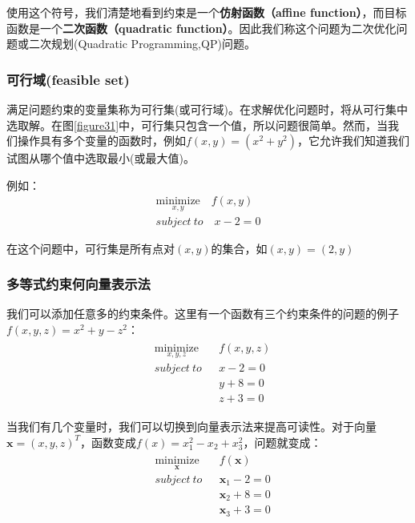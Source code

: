 使用这个符号，我们清楚地看到约束是一个\textbf{仿射函数（affine function）}，而目标函数是一个\textbf{二次函数（quadratic function）}。因此我们称这个问题为二次优化问题或二次规划(Quadratic Programming,QP)问题。

\subsubsection{可行域(feasible set)}

满足问题约束的变量集称为可行集(或可行域)。在求解优化问题时，将从可行集中选取解。在图\ref{figure31}中，可行集只包含一个值，所以问题很简单。然而，当我们操作具有多个变量的函数时，例如$f(x,y)=(x^2+y^2)$，它允许我们知道我们试图从哪个值中选取最小(或最大值)。

例如：
\begin{gather*}
\underset{x,y}{\text{minimize}} \quad f(x,y) \\
subject \ to \quad x-2=0
\end{gather*}

在这个问题中，可行集是所有点对$(x,y)$的集合，如$(x,y)=(2,y)$

\subsubsection{多等式约束何向量表示法}

我们可以添加任意多的约束条件。这里有一个函数有三个约束条件的问题的例子$f(x,y,z)=x^2+y-z^2$：
\begin{gather*}
\begin{align*}
& \underset{x,y,z}{\text{minimize}} \quad & f(x,y,z) \\
& subject \ to  & x-2=0 \\
& & y+8=0 \\
& & z+3=0
\end{align*}
\end{gather*}

当我们有几个变量时，我们可以切换到向量表示法来提高可读性。对于向量$\mathbf{x}=(x,y,z)^T$，函数变成$f(x)=x_1^2-x_2+x_3^2$，问题就变成：
\begin{gather*}
\begin{align*}
& \underset{\mathbf{x}}{\text{minimize}} \quad & f(\mathbf{x}) \\
& subject \ to  & \mathbf{x}_1-2=0 \\
& & \mathbf{x}_2+8=0 \\
& & \mathbf{x}_3+3=0
\end{align*}
\end{gather*}

